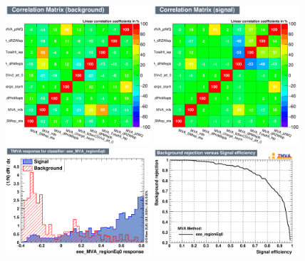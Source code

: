 \begin{figure}[htbp]
	\includegraphics[width=0.48\textwidth]{6_Search/Figures/MVAtechnics/singletopzut/eee/CorrelationMatrixB.png}
	\includegraphics[width=0.48\textwidth]{6_Search/Figures/MVAtechnics/singletopzut/eee/CorrelationMatrixS.png}
	\includegraphics[width=0.48\textwidth]{6_Search/Figures/MVAtechnics/singletopzut/eee/mva_eee_MVA_regionEq0.png}
	\includegraphics[width=0.48\textwidth]{6_Search/Figures/MVAtechnics/singletopzut/eee/rejBvsS.png}

\end{figure}
